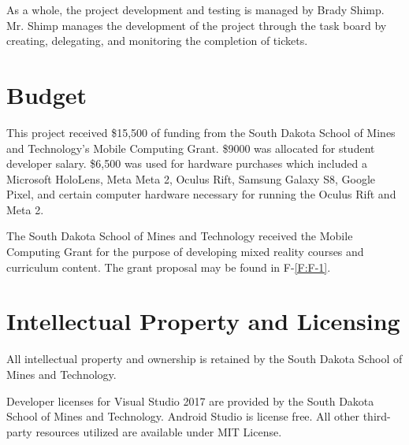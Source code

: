 As a whole, the project development and testing is managed by Brady Shimp. Mr. Shimp manages the development of the project through the task board by creating, delegating, and monitoring the completion of tickets. 

\section{Budget}

This project received \$15,500 of funding from the South Dakota School of Mines and Technology's Mobile Computing Grant. \$9000 was allocated for student developer salary. \$6,500 was used for hardware purchases which included a Microsoft HoloLens, Meta Meta 2, Oculus Rift, Samsung Galaxy S8, Google Pixel, and certain computer hardware necessary for running the Oculus Rift and Meta 2. 
 
The South Dakota School of Mines and Technology received the Mobile Computing Grant for the purpose of developing mixed reality courses and curriculum content. The grant proposal may be found in F-\ref{F:F-1}.

\section{Intellectual Property and Licensing}

All intellectual property and ownership is retained by the South Dakota School of Mines and Technology.

Developer licenses for Visual Studio 2017 are provided by the South Dakota School of Mines and Technology. Android Studio is license free. All other third-party resources utilized are available under MIT License. 

